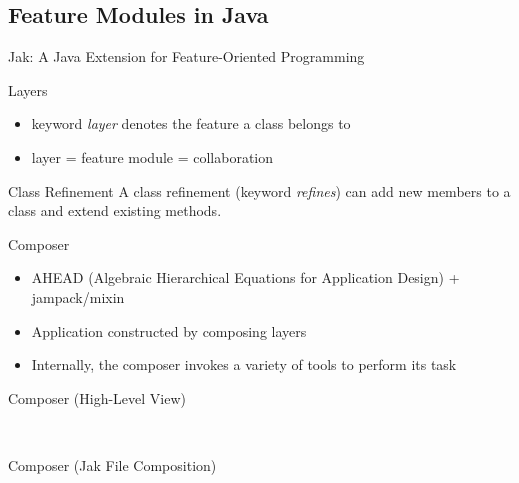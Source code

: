 \subsection{Feature Modules in Java}

\begin{frame}{Jak: A Java Extension for Feature-Oriented Programming } %
	\begin{mycolumns}[animation=none]
		\begin{definition}{Layers}
			\begin{itemize}
				\item keyword \emph{layer} denotes the feature a class belongs to
				\item layer = feature module = collaboration %
			\end{itemize}
		\end{definition}
		\begin{definition}{Class Refinement}
			A class refinement (keyword \emph{refines}) can add new members to a class and extend existing methods. 
		\end{definition}
		\begin{definition}{Composer}
			\begin{itemize}
				\item AHEAD (Algebraic Hierarchical Equations for Application Design) + jampack/mixin
				\item Application constructed by composing layers
				\item Internally, the composer invokes a variety of tools to perform its task
			\end{itemize}
		\end{definition}
	\mynextcolumn
		\begin{exampletight}{Composer (High-Level View)}
			\centering
		\end{exampletight}
		
		~
		
		\begin{exampletight}{Composer (Jak File Composition)}
			\centering
		\end{exampletight}
	\end{mycolumns}
\end{frame}

